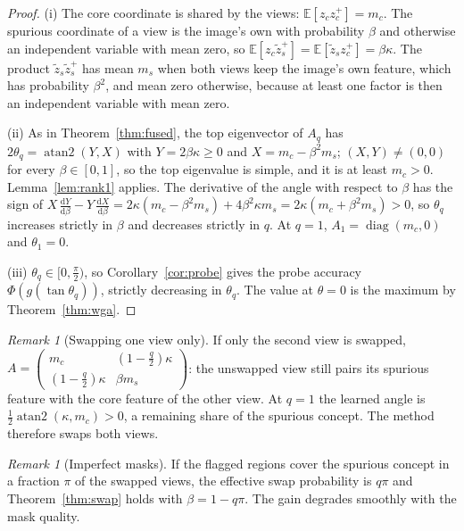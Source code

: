 \documentclass[11pt]{article}
\theoremstyle{definition}
\theoremstyle{remark}
\newtheorem{remark}[theorem]{Remark}
\newcommand{\E}{\mathbb{E}}
\begin{document}
\begin{proof}
(i) The core coordinate is shared by the views: $\E[z_cz_c^+]=m_c$. The spurious coordinate of a view is the image's
own with probability $\beta$ and otherwise an independent variable with mean zero, so
$\E[z_c\tilde z_s^+]=\E[\tilde z_sz_c^+]=\beta\kappa$. The product $\tilde z_s\tilde z_s^+$ has mean $m_s$ when both
views keep the image's own feature, which has probability $\beta^2$, and mean zero otherwise, because at least one
factor is then an independent variable with mean zero.

(ii) As in Theorem~\ref{thm:fused}, the top eigenvector of $A_q$ has $2\theta_q=\operatorname{atan2}(Y,X)$ with
$Y=2\beta\kappa\ge0$ and $X=m_c-\beta^2m_s$; $(X,Y)\ne(0,0)$ for every $\beta\in[0,1]$, so the top eigenvalue is
simple, and it is at least $m_c>0$. Lemma~\ref{lem:rank1} applies. The derivative of the angle with respect to $\beta$
has the sign of
$X\,\tfrac{\mathrm{d}Y}{\mathrm{d}\beta}-Y\,\tfrac{\mathrm{d}X}{\mathrm{d}\beta}
=2\kappa(m_c-\beta^2m_s)+4\beta^2\kappa m_s=2\kappa(m_c+\beta^2m_s)>0$, so $\theta_q$ increases strictly in $\beta$
and decreases strictly in $q$. At $q=1$, $A_1=\operatorname{diag}(m_c,0)$ and $\theta_1=0$.

(iii) $\theta_q\in[0,\tfrac\pi2)$, so Corollary~\ref{cor:probe} gives the probe accuracy $\Phi(g(\tan\theta_q))$,
strictly decreasing in $\theta_q$. The value at $\theta=0$ is the maximum by Theorem~\ref{thm:wga}.
\end{proof}

\begin{remark}[Swapping one view only]\label{rem:oneview}
If only the second view is swapped, $A=\begin{pmatrix}m_c&(1-\tfrac q2)\kappa\\(1-\tfrac q2)\kappa&\beta m_s\end{pmatrix}$:
the unswapped view still pairs its spurious feature with the core feature of the other view. At $q=1$ the learned
angle is $\tfrac12\operatorname{atan2}(\kappa,m_c)>0$, a remaining share of the spurious concept. The method
therefore swaps both views.
\end{remark}

\begin{remark}[Imperfect masks]\label{rem:imperfect}
If the flagged regions cover the spurious concept in a fraction $\pi$ of the swapped views, the effective swap
probability is $q\pi$ and Theorem~\ref{thm:swap} holds with $\beta=1-q\pi$. The gain degrades smoothly with the mask
quality.
\end{remark}
\end{document}
